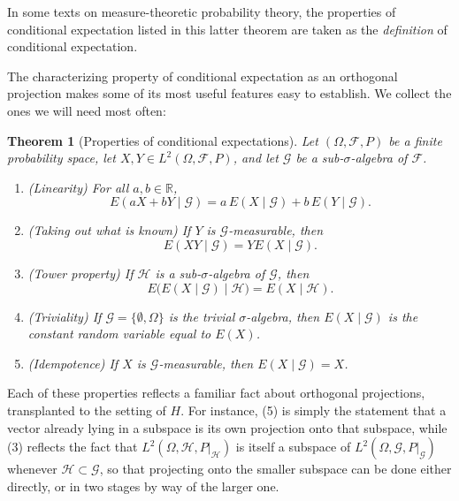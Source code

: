 \documentclass[11pt]{book}
\newtheorem{thm}{Theorem}[section]
\theoremstyle{definition}
\numberwithin{equation}{section}
\begin{document}
In some texts on measure-theoretic probability theory, the properties of conditional expectation listed in this latter theorem are taken as the \textit{definition} of conditional expectation.

The characterizing property of conditional expectation as an orthogonal projection makes some of its most useful features easy to establish. We collect the ones we will need most often:

\begin{thm}[Properties of conditional expectations]\label{thm:cond-exp-properties}
	Let $(\Omega, \mathcal{F}, P)$ be a finite probability space, let $X, Y \in L^2(\Omega, \mathcal{F}, P)$, and let $\mathcal{G}$ be a sub-$\sigma$-algebra of $\mathcal{F}$.
	\begin{enumerate}
		\item (\textit{Linearity}) For all $a,b \in \mathbb{R}$,
		      \[
			      E(aX + bY \mid \mathcal{G}) = a\,E(X\mid \mathcal{G}) + b\,E(Y \mid \mathcal{G}).
		      \]
		\item (\textit{Taking out what is known}) If $Y$ is $\mathcal{G}$-measurable, then
		      \[
			      E(XY \mid \mathcal{G}) = Y E(X \mid \mathcal{G}).
		      \]
		\item (\textit{Tower property}) If $\mathcal{H}$ is a sub-$\sigma$-algebra of $\mathcal{G}$, then
		      \[
			      E\big(E(X\mid \mathcal{G}) \mid \mathcal{H}\big) = E(X \mid \mathcal{H}).
		      \]
		\item (\textit{Triviality}) If $\mathcal{G} = \{\emptyset, \Omega\}$ is the trivial $\sigma$-algebra, then $E(X \mid \mathcal{G})$ is the constant random variable equal to $E(X)$.
		\item (\textit{Idempotence}) If $X$ is $\mathcal{G}$-measurable, then $E(X \mid \mathcal{G}) = X$.
	\end{enumerate}
\end{thm}

Each of these properties reflects a familiar fact about orthogonal projections, transplanted to the setting of $H$. For instance, (5) is simply the statement that a vector already lying in a subspace is its own projection onto that subspace, while (3) reflects the fact that $L^2(\Omega,\mathcal{H},P|_{\mathcal{H}})$ is itself a subspace of $L^2(\Omega,\mathcal{G},P|_{\mathcal{G}})$ whenever $\mathcal{H} \subset \mathcal{G}$, so that projecting onto the smaller subspace can be done either directly, or in two stages by way of the larger one.
\end{document}
